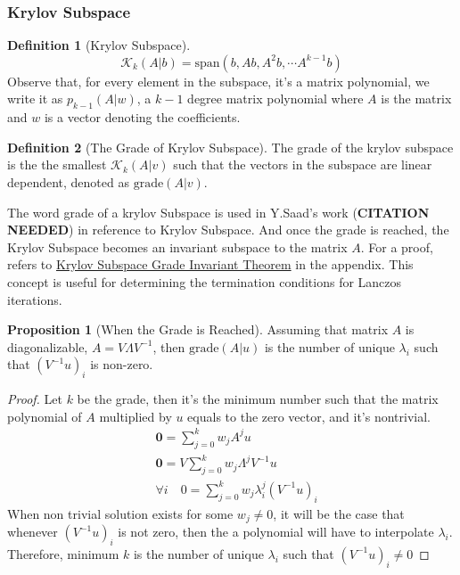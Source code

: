 \documentclass[]{article}
\theoremstyle{definition}
\newtheorem{prop}{Proposition}[section]  %
\newtheorem{definition}{Definition}
\begin{document}
        \subsubsection{Krylov Subspace}
            \begin{definition}[Krylov Subspace]
                $$
                \mathcal{K}_k(A|b) = \text{span}( b, Ab, A^2b, \cdots A^{k - 1}b)
                $$
                Observe that, for every element in the subspace, it's a matrix polynomial, we write it as $p_{k-1}(A|w)$, a $k-1$ degree matrix polynomial where $A$ is the matrix and $w$ is a vector denoting the coefficients. 
            \end{definition}
            \begin{definition}[The Grade of Krylov Subspace]
                The grade of the krylov subspace is the the smallest $\mathcal K_{k}(A|v)$ such that the vectors in the subspace are linear dependent, denoted as $\text{grade}(A|v)$. 
            \end{definition}
            The word grade of a krylov Subspace is used in Y.Saad's work (\textbf{CITATION NEEDED}) in reference to Krylov Subspace. And once the grade is reached, the Krylov Subspace becomes an invariant subspace to the matrix $A$. For a proof, refers to \hyperref[prop:Krylov_Subspace_Grade_Invariant_Theorem]{Krylov Subspace Grade Invariant Theorem} in the appendix. This concept is useful for determining the termination conditions for Lanczos iterations.  
            \begin{prop}[When the Grade is Reached]\label{prop:When_the_Grade_is_Reached}
                Assuming that matrix $A$ is diagonalizable, $A = V\Lambda V^{-1}$, then $\text{grade}(A|u)$ is the number of unique $\lambda_i$ such that $(V^{-1}u)_i$ is non-zero. 
            \end{prop}
            \begin{proof}
                Let $k$ be the grade, then it's the minimum number such that the matrix polynomial of $A$ multiplied by $u$ equals to the zero vector, and it's nontrivial. 
                \begin{align}
                    & \mathbf 0 = \sum_{j = 0}^{k}
                    w_jA^{j}u
                    \\
                    & \mathbf 0 = V\sum_{j = 0}^{k} w_j\Lambda^jV^{-1}u
                    \\
                    & \forall i \quad 0 = \sum_{j = 0}^{k} w_j\lambda_i^{j}(V^{-1}u)_i
                \end{align}
                When non trivial solution exists for some $w_j \neq 0$, it will be the case that whenever $(V^{-1}u)_i$ is not zero, then the a polynomial will have to interpolate $\lambda_i$. Therefore, minimum $k$ is the number of unique $\lambda_i$ such that $(V^{-1}u)_i\neq 0$
            \end{proof}
            
\end{document}
